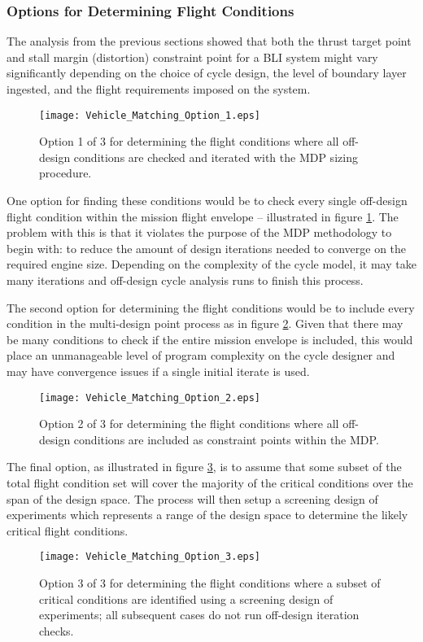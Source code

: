 		\subsubsection{Options for Determining Flight Conditions}
			The analysis from the previous sections showed that both the thrust target point and stall margin (distortion) constraint point for a BLI system might vary significantly depending on the choice of cycle design, the level of boundary layer ingested, and the flight requirements imposed on the system.  
			\begin{figure}[htp]
				\centering
				\texttt{[image: Vehicle\_Matching\_Option\_1.eps]}
				\caption{Option 1 of 3 for determining the flight conditions where all off-design conditions are checked and iterated with the MDP sizing procedure.}
				\label{Vehicle_Matching_Option_1}
			\end{figure}	
			One option for finding these conditions would be to check every single off-design flight condition within the mission flight envelope -- illustrated in figure \ref{Vehicle_Matching_Option_1}.  The problem with this is that it violates the purpose of the MDP methodology to begin with:  to reduce the amount of design iterations needed to converge on the required engine size.  Depending on the complexity of the cycle model, it may take many iterations and off-design cycle analysis runs to finish this process.  
			
			The second option for determining the flight conditions would be to include every condition in the multi-design point process as in figure \ref{Vehicle_Matching_Option_2}.  Given that there may be many conditions to check if the entire mission envelope is included, this would place an unmanageable level of program complexity on the cycle designer and may have convergence issues if a single initial iterate is used.  
			\begin{figure}[htp]
				\centering
				\texttt{[image: Vehicle\_Matching\_Option\_2.eps]}
				\caption{Option 2 of 3 for determining the flight conditions where all off-design conditions are included as constraint points within the MDP.}
				\label{Vehicle_Matching_Option_2}
			\end{figure}	
			The final option, as illustrated in figure \ref{Vehicle_Matching_Option_3}, is to assume that some subset of the total flight condition set will cover the majority of the critical conditions over the span of the design space.  The process will then setup a screening design of experiments which represents a range of the design space to determine the likely critical flight conditions.   
			\begin{figure}[htp, trim = 25mm 0mm 0mm 0mm]
				\centering
				\texttt{[image: Vehicle\_Matching\_Option\_3.eps]}
				\caption{Option 3 of 3 for determining the flight conditions where a subset of critical conditions are identified using a screening design of experiments; all subsequent cases do not run off-design iteration checks.}
				\label{Vehicle_Matching_Option_3}
			\end{figure}	
			
